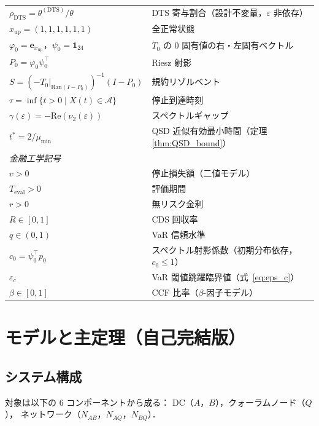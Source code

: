 \documentclass[12pt,a4paper]{article}
\theoremstyle{plain}
\theoremstyle{definition}
\theoremstyle{remark}
\newcommand{\calA}{\mathcal{A}}
\newcommand{\eps}{\varepsilon}
\newcommand{\RedRes}{S}
\newcommand{\Proj}{P}
\newcommand{\thetaDTS}{\theta^{(\mathrm{DTS})}}
\newcommand{\rhoDTS}{\rho_{\mathrm{DTS}}}
\newcommand{\Teval}{T_{\mathrm{eval}}}
\begin{document}
\begin{table}[H]
\begin{tabular}{p{6cm}p{8.5cm}}
    $\rhoDTS = \thetaDTS/\theta$ & DTS 寄与割合（設計不変量，$\eps$ 非依存） \\
    $x_{\mathrm{up}} = (1,1,1,1,1,1)$ & 全正常状態 \\
    $\varphi_0=\mathbf{e}_{x_{\mathrm{up}}}$，$\psi_0=\mathbf{1}_{24}$ & $T_0$ の 0 固有値の右・左固有ベクトル \\
    $\Proj_0 = \varphi_0\psi_0^\top$ & Riesz 射影 \\
    $\RedRes = (-T_0|_{\mathrm{Ran}(I-\Proj_0)})^{-1}(I-\Proj_0)$ & 規約リゾルベント \\
    $\tau = \inf\{t>0\mid X(t)\in\calA\}$ & 停止到達時刻 \\
    $\gamma(\eps) = -\mathrm{Re}(\nu_2(\eps))$ & スペクトルギャップ \\
    $t^* = 2/\mu_{\min}$ & QSD 近似有効最小時間（定理 \ref{thm:QSD_bound}） \\
    \midrule
    \multicolumn{2}{l}{\textit{金融工学記号}} \\
    \midrule
    $v > 0$ & 停止損失額（二値モデル） \\
    $\Teval > 0$ & 評価期間 \\
    $r > 0$ & 無リスク金利 \\
    $R \in [0,1]$ & CDS 回収率 \\
    $q \in (0,1)$ & VaR 信頼水準 \\
    $c_0 = \psi_0^\top p_0$ & スペクトル射影係数（初期分布依存，$c_0\le1$） \\
    $\eps_c$ & VaR 閾値跳躍臨界値（式~\eqref{eq:eps_c}） \\
    $\beta \in [0,1]$ & CCF 比率（$\beta$-因子モデル） \\
    \bottomrule
  \end{tabular}
\end{table}

\section{モデルと主定理（自己完結版）}\label{sec:model}

\subsection{システム構成}

対象は以下の 6 コンポーネントから成る：
DC（$A$，$B$），クォーラムノード（$Q$），
ネットワーク（$N_{AB}$，$N_{AQ}$，$N_{BQ}$）．
\end{document}
